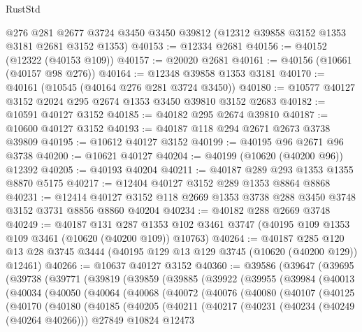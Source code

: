 \begin{lexlean}{RustStd}
\begin{coremodule}
    @276
    @281
    @2677
    @3724
    @3450
    @3450
    @39812
    (@12312 @39858 @3152 @1353 @3181 @2681 @3152 @1353)
@40153 := @12334 @2681
@40156 := @40152 (@12322 (@40153 @109))
@40157 := @20020 @2681
@40161 := @40156 (@10661 (@40157 @98 @276))
@40164 := @12348 @39858 @1353 @3181
@40170 := @40161 (@10545 (@40164 @276 @281 @3724 @3450))
@40180 := @10577 @40127 @3152 @2024 @295 @2674 @1353 @3450 @39810 @3152 @2683
@40182 := @10591 @40127 @3152
@40185 := @40182 @295 @2674 @39810
@40187 := @10600 @40127 @3152
@40193 := @40187 @118 @294 @2671 @2673 @3738 @39809
@40195 := @10612 @40127 @3152
@40199 := @40195 @96 @2671 @96 @3738
@40200 := @10621 @40127
@40204 := @40199 (@10620 (@40200 @96)) @12392
@40205 := @40193 @40204
@40211 := @40187 @289 @293 @1353 @1355 @8870 @5175
@40217 := @12404 @40127 @3152 @289 @1353 @8864 @8868
@40231 := @12414 @40127 @3152 @118 @2669 @1353 @3738 @288 @3450 @3748 @3152 @3731 @8856 @8860 @40204
@40234 := @40182 @288 @2669 @3748
@40249 := @40187
    @131
    @287
    @1353
    @102
    @3461
    @3747
    (@40195 @109 @1353 @109 @3461 (@10620 (@40200 @109)) @10763)
@40264 := @40187
    @285
    @120
    @13
    @28
    @3745
    @3444
    (@40195 @129 @13 @129 @3745 (@10620 (@40200 @129)) @12461)
@40266 := @10637 @40127 @3152
@40360 := @39586
    (@39647
      (@39695
        (@39738
          (@39771
            (@39819
              (@39859
                (@39885
                  (@39922
                    (@39955
                      (@39984
                        (@40013
                          (@40034
                            (@40050
                              (@40064
                                (@40068
                                  (@40072
                                    (@40076
                                      (@40080
                                        (@40107
                                          (@40125
                                            (@40170
                                              (@40180
                                                (@40185
                                                  (@40205
                                                    (@40211
                                                      (@40217
                                                        (@40231
                                                          (@40234 (@40249 (@40264 @40266)))
                                                          @27849
                                                          @10824
                                                          @12473

\end{coremodule}
\end{lexlean}
